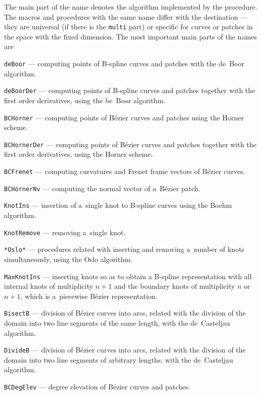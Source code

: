 The main part of the name denotes the algorithm implemented by the
procedure. The macros and procedures with the same name differ with the
destination --- they are universal (if there is the \texttt{multi} part)
or specific for curves or patches in the space with the fixed dimension.
The most important main parts of the names are
\begin{mydescription}
  \item\texttt{deBoor} --- computing points of B-spline curves and patches
    with the de~Boor algorithm.
  \item\texttt{deBoorDer} --- computing points of B-spline curves and patches
    together with the first order derivatives, using the be~Boor algorithm.
  \item\texttt{BCHorner} --- computing points of B\'{e}zier curves and patches
    using the Horner scheme.
  \item\texttt{BCHornerDer} --- computing points of B\'{e}zier curves and patches
    together with the first order derivatives, using the Horner scheme.
  \item\texttt{BCFrenet} --- computing curvatures and Frenet frame vectors
    of B\'{e}zier curves.
  \item\texttt{BCHornerNv} --- computing the normal vector of a~B\'{e}zier patch.
  \item\texttt{KnotIns} --- insertion of a~single knot to B-spline
    curves using the Boehm algorithm.
  \item\texttt{KnotRemove} --- removing a~single knot.
  \item\texttt{*Oslo*} --- procedures related with inserting and removing
    a~number of knots simultaneously, using the Oslo algorithm.
  \item\texttt{MaxKnotIns} --- inserting knots so as to obtain a B-spline
    representation with all internal knots of multiplicity $n+1$ and
    the boundary knots of multiplicity $n$ or $n+1$, which is a~piecewise
    B\'{e}zier representation.
  \item\texttt{BisectB} --- division of B\'{e}zier curves into arcs, related with
    the division of the domain into two line segments of the same length,
    with the de~Casteljau algorithm.
  \item\texttt{DivideB} --- division of B\'{e}zier curves into arcs, related with
    the division of the domain into two line segments of arbitrary lengths,
    with the de~Casteljau algorithm.
  \item\texttt{BCDegElev} --- degree elevation of B\'{e}zier curves and patches.

\end{mydescription}

